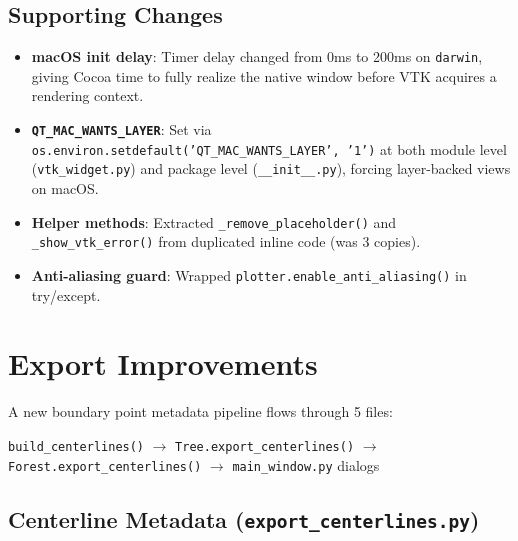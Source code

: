 \documentclass[11pt,a4paper]{article}
\begin{document}
\subsection{Supporting Changes}

\begin{itemize}[nosep]
    \item \textbf{macOS init delay}: Timer delay changed from 0ms to 200ms on \texttt{darwin}, giving Cocoa time to fully realize the native window before VTK acquires a rendering context.
    \item \textbf{\texttt{QT\_MAC\_WANTS\_LAYER}}: Set via \texttt{os.environ.setdefault('QT\_MAC\_WANTS\_LAYER', '1')} at both module level (\texttt{vtk\_widget.py}) and package level (\texttt{\_\_init\_\_.py}), forcing layer-backed views on macOS.
    \item \textbf{Helper methods}: Extracted \texttt{\_remove\_placeholder()} and \texttt{\_show\_vtk\_error()} from duplicated inline code (was 3 copies).
    \item \textbf{Anti-aliasing guard}: Wrapped \texttt{plotter.enable\_anti\_aliasing()} in try/except.
\end{itemize}

\section{Export Improvements}

A new boundary point metadata pipeline flows through 5 files:

\begin{center}
\texttt{build\_centerlines()} $\to$ \texttt{Tree.export\_centerlines()} $\to$ \texttt{Forest.export\_centerlines()} $\to$ \texttt{main\_window.py} dialogs
\end{center}

\subsection{Centerline Metadata (\texttt{export\_centerlines.py})}
\end{document}
